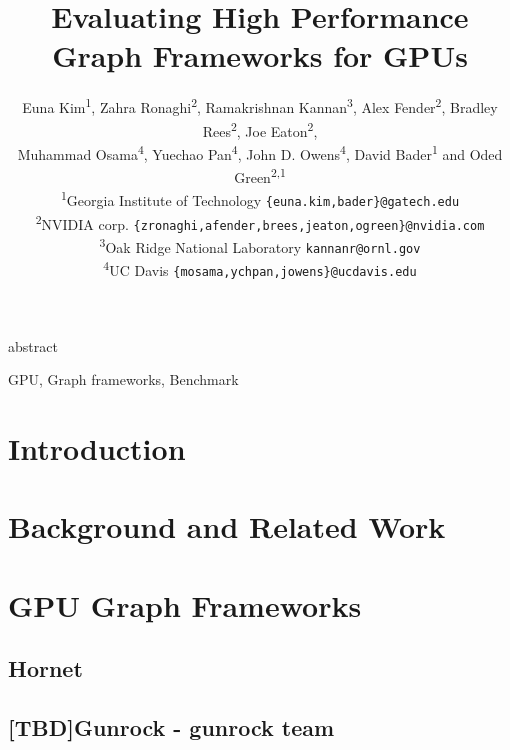 \documentclass[conference]{IEEEtran}
\newcommand*{\affaddr}[1]{#1} %
\newcommand*{\affmark}[1][*]{\textsuperscript{#1}}
\newcommand*{\email}[1]{\texttt{#1}}
\begin{document}
\title{Evaluating High Performance Graph Frameworks for GPUs}

\author{%
Euna Kim\affmark[1], Zahra Ronaghi\affmark[2], Ramakrishnan Kannan\affmark[3], Alex Fender\affmark[2], Bradley Rees\affmark[2], Joe Eaton\affmark[2],\\ Muhammad Osama\affmark[4], Yuechao Pan\affmark[4], John D. Owens\affmark[4], David Bader\affmark[1] and Oded Green\affmark[2,1]\\
\affaddr{\affmark[1]Georgia Institute of Technology} \email{\{euna.kim,bader\}@gatech.edu}\\
\affaddr{\affmark[2]NVIDIA corp.} \email{\{zronaghi,afender,brees,jeaton,ogreen\}@nvidia.com}\\
\affaddr{\affmark[3]Oak Ridge National Laboratory} \email{kannanr@ornl.gov}\\
\affaddr{\affmark[4]UC Davis} \email{\{mosama,ychpan,jowens\}@ucdavis.edu}
}



\maketitle

 {abstract}
\begin{IEEEkeywords}
GPU, Graph frameworks, Benchmark
\end{IEEEkeywords}

\section{Introduction}
\label{sec:intro}


\section{Background and Related Work}
\label{sec:background-related}


\section{GPU Graph Frameworks} %
\label{sec:gpu-framework}

\subsection{Hornet}

\subsection{[TBD]Gunrock - gunrock team}

\end{document}

